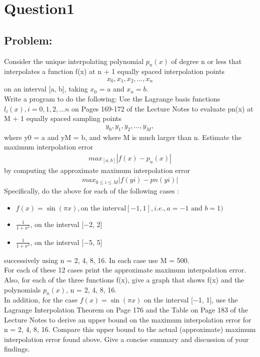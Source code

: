 \section{Question1}
\subsection{Problem:}
Consider the unique interpolating polynomial $p_{n}(x)$ of degree n or less that interpolates a
function f(x) at n + 1 equally spaced interpolation points \\
\begin{align*}
{x_0, x_{1}, x_{2}, \ldots , x_{n}}
\end{align*}
on an interval [a, b], taking $x_0$ = a and $x_n = b$. \\
Write a program to do the following: Use the Lagrange basis functions $l_{i}(x), i = 0, 1, 2,\ldots n$
on Pages 169-172 of the Lecture Notes to evaluate pn(x) at M + 1 equally spaced sampling
points \\
\begin{align*}
{y_0, y_1, y_2, \ldots , y_M},
\end{align*}
where y0 = a and yM = b, and where M is much larger than n. Estimate the maximum
interpolation error \\
\begin{align*}
max_{[a,b]}  |f(x) − p_{n}(x)|
\end{align*}
by computing the approximate maximum interpolation error \\
\begin{align*}
max_{0\le i \le M} |f(yi) − pn(yi)|
\end{align*}
Specifically, do the above for each of the following cases :
\begin{itemize}
    \item $f(x) = \sin(\pi x) , \text{on the interval} [−1, 1] , i.e., a = −1 \text{ and } b = 1)$
    \item $\frac{1}{1+x^2}$, on the interval [−2, 2]
    \item $\frac{1}{1+x^2}$, on the interval [−5, 5]
\end{itemize}

successively using n = 2, 4, 8, 16. In each case use M = 500. \\
For each of these 12 cases print the approximate maximum interpolation error. \\
Also, for each of the three functions f(x), give a graph that shows f(x) and the polynomials 
$p_{n}(x)$, n = 2, 4, 8, 16. \\
In addition, for the case $f(x) = \sin(\pi x)$ on the interval [−1, 1], use the Lagrange Interpolation
Theorem on Page 176 and the Table on Page 183 of the Lecture Notes to derive an upper
bound on the maximum interpolation error for n = 2, 4, 8, 16. Compare this upper bound to
the actual (approximate) maximum interpolation error found above.
Give a concise summary and discussion of your findings.

